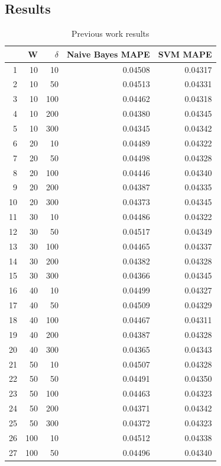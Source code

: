 \documentclass[a4paper]{article}
\begin{document}
\subsection{Results}

\begin{table}[!h]
\centering
\caption{Previous work results}
\label{tab:results_prev}
\begin{tabular}{rrrrr}
  \hline
 & W & $\delta$ & Naive Bayes MAPE & SVM MAPE \\ 
  \hline
1 & 10 & 10 & 0.04508 & 0.04317 \\ 
  2 & 10 & 50 & 0.04513 & 0.04331 \\ 
  3 & 10 & 100 & 0.04462 & 0.04318 \\ 
  4 & 10 & 200 & 0.04380 & 0.04345 \\ 
  5 & 10 & 300 & 0.04345 & 0.04342 \\ 
  6 & 20 & 10 & 0.04489 & 0.04322 \\ 
  7 & 20 & 50 & 0.04498 & 0.04328 \\ 
  8 & 20 & 100 & 0.04446 & 0.04340 \\ 
  9 & 20 & 200 & 0.04387 & 0.04335 \\ 
  10 & 20 & 300 & 0.04373 & 0.04345 \\ 
  11 & 30 & 10 & 0.04486 & 0.04322 \\ 
  12 & 30 & 50 & 0.04517 & 0.04349 \\ 
  13 & 30 & 100 & 0.04465 & 0.04337 \\ 
  14 & 30 & 200 & 0.04382 & 0.04328 \\ 
  15 & 30 & 300 & 0.04366 & 0.04345 \\ 
  16 & 40 & 10 & 0.04499 & 0.04327 \\ 
  17 & 40 & 50 & 0.04509 & 0.04329 \\ 
  18 & 40 & 100 & 0.04467 & 0.04311 \\ 
  19 & 40 & 200 & 0.04387 & 0.04328 \\ 
  20 & 40 & 300 & 0.04365 & 0.04343 \\ 
  21 & 50 & 10 & 0.04507 & 0.04328 \\ 
  22 & 50 & 50 & 0.04491 & 0.04350 \\ 
  23 & 50 & 100 & 0.04463 & 0.04323 \\ 
  24 & 50 & 200 & 0.04371 & 0.04342 \\ 
  25 & 50 & 300 & 0.04372 & 0.04323 \\ 
  26 & 100 & 10 & 0.04512 & 0.04338 \\ 
  27 & 100 & 50 & 0.04496 & 0.04340 \\ 

\end{tabular}
\end{table}
\end{document}
